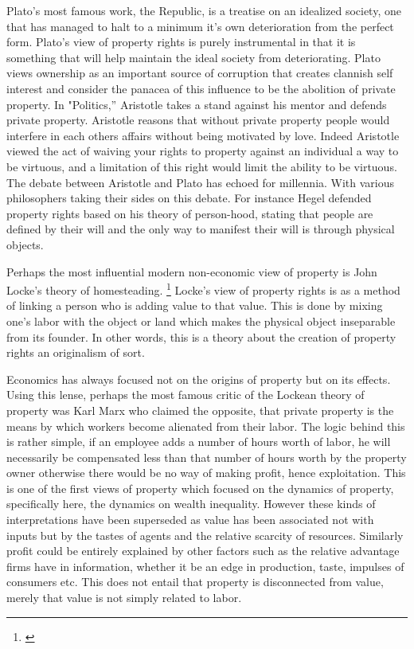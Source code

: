 \documentclass[12pt]{article}
\numberwithin{equation}{section}
\begin{document}
Plato's most famous work, the Republic, is a treatise on an idealized society, one that has managed to halt to a minimum it's own deterioration from the perfect form. Plato's view of property rights is purely instrumental in that it is something that will help maintain the ideal society from deteriorating. Plato views ownership as an important source of corruption that creates clannish self interest and consider the panacea of this influence to be the abolition of private property. 
In "Politics,'' Aristotle takes a stand against his mentor and defends private property. Aristotle reasons that without private property people would interfere in each others affairs without being motivated by love. Indeed Aristotle viewed the act of waiving your rights to property against an individual a way to be virtuous, and a limitation of this right would limit the ability to be virtuous. The debate between Aristotle and Plato has echoed for millennia. With various philosophers taking their sides on this debate. For instance Hegel defended property rights based on his theory of person-hood, stating that people are defined by their will and the only way to manifest their will is through physical objects. 

Perhaps the most influential modern non-economic view of property is John Locke's theory of homesteading. \footnote{\cite{locke2014second}} Locke's view of property rights is as a method of linking a person who is adding value to that value. This is done by mixing one's labor with the object or land which makes the physical object inseparable from its founder. In other words, this is a theory about the creation of property rights an originalism of sort. 

Economics has always focused not on the origins of property but on its effects. Using this lense, perhaps the most famous critic of the Lockean theory of property was Karl Marx who claimed the opposite, that private property is the means by which workers become alienated from their labor. The logic behind this is rather simple, if an employee adds a number of hours worth of labor, he will necessarily be compensated less than that number of hours worth by the property owner otherwise there would be no way of making profit, hence exploitation. This is one of the first views of property which focused on the dynamics of property, specifically here, the dynamics on wealth inequality. However these kinds of interpretations have been superseded as value has been associated not with inputs but by the tastes of agents and the relative scarcity of resources. Similarly profit could be entirely explained by other factors such as the relative advantage firms have in information, whether it be an edge in production, taste, impulses of consumers etc. This does not entail that property is disconnected from value, merely that value is not simply related to labor. 
\end{document}

